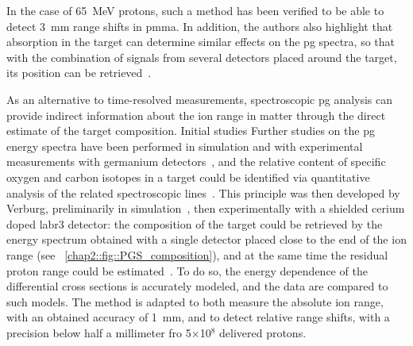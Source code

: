 In the case of 65~MeV protons, such a method has been verified to be able to detect 3~mm range shifts in \gls{pmma}. In addition, the authors also highlight that absorption in the target can determine similar effects on the \gls{pg} spectra, so that with the combination of signals from several detectors placed around the target, its position can be retrieved~\parencite{Krimmer2017b}.

As an alternative to time-resolved measurements, spectroscopic \gls{pg} analysis can provide indirect information about the ion range in matter through the direct estimate of the target composition. Initial studies Further studies on the \gls{pg} energy spectra have been performed in simulation and with experimental measurements with germanium detectors~\parencite{Polf2009, Polf2009b}, and the relative content of specific oxygen and carbon isotopes in a target could be identified via quantitative analysis of the related spectroscopic lines~\parencite{Polf2013}. This principle was then developed by Verburg, preliminarily in simulation~\parencite{Verburg2012}, then experimentally with a shielded cerium doped \gls{labr3} detector: the composition of the target could be retrieved by the energy spectrum obtained with a single detector placed close to the end of the ion range (see \figurename~\ref{chap2::fig::PGS_composition}), and at the same time the residual proton range could be estimated~\parencite{Verburg2013, Verburg2014}. To do so, the energy dependence of the differential cross sections is accurately modeled, and the data are compared to such models. The method is adapted to both measure the absolute ion range, with an obtained accuracy of 1~mm, and to detect relative range shifts, with a precision below half a millimeter fro 5$\times$10$^8$ delivered protons. 

